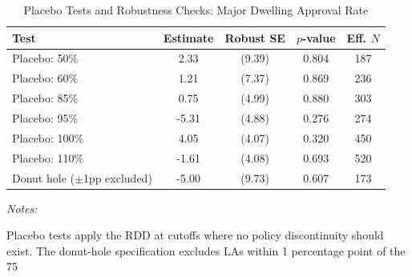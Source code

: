 \begin{table}[!h]
\centering
\caption{\label{tab:tab:robustness}Placebo Tests and Robustness Checks: Major Dwelling Approval Rate}
\centering
\begin{threeparttable}
\begin{tabular}[t]{lcccc}
\toprule
Test & Estimate & Robust SE & $p$-value & Eff. $N$\\
\midrule
Placebo: 50\% & 2.33 & (9.39) & 0.804 & 187\\
Placebo: 60\% & 1.21 & (7.37) & 0.869 & 236\\
Placebo: 85\% & 0.75 & (4.99) & 0.880 & 303\\
Placebo: 95\% & -5.31 & (4.88) & 0.276 & 274\\
Placebo: 100\% & 4.05 & (4.07) & 0.320 & 450\\
\addlinespace
Placebo: 110\% & -1.61 & (4.08) & 0.693 & 520\\
Donut hole ($\pm$1pp excluded) & -5.00 & (9.73) & 0.607 & 173\\
\bottomrule
\end{tabular}
\begin{tablenotes}
\item \textit{Notes:} 
\item Placebo tests apply the RDD at cutoffs where no policy discontinuity should exist. The donut-hole specification excludes LAs within 1 percentage point of the 75%
\end{tablenotes}
\end{threeparttable}
\end{table}
